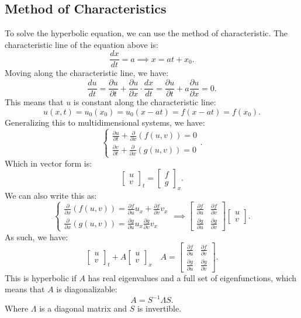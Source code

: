 \documentclass[../main/main.tex]{subfiles}
\begin{document}
\subsection{Method of Characteristics}
To solve the hyperbolic equation, we can use the method of characteristic. The characteristic line of the equation above is: \[
\frac{dx}{dt} = a \implies x = at + x_0
.\] Moving along the characteristic line, we have: \[
\frac{du}{dt}=  \frac{\partial u}{\partial t} + \frac{\partial u}{\partial x} \cdot  \frac{dx}{dt} =  \frac{\partial u}{\partial t} +a \frac{\partial u}{\partial x}  = 0
.\] This means that $u$ is constant along the characteristic line: \[
u(x,t) = u_0(x_0) = u_0(x-at) = f(x-at) = f(x_0)
.\] Generalizing this to multidimensional systems, we have: \[
\begin{cases}
    \frac{\partial u}{\partial t} + \frac{\partial }{\partial x} (f(u,v)) = 0 \\
    \frac{\partial v}{\partial t} + \frac{\partial }{\partial x} (g(u,v)) = 0
\end{cases}
.\] 
Which in vector form is: \[
    \begin{bmatrix} u\\v \end{bmatrix} _t = \begin{bmatrix} f \\ g \end{bmatrix} _x 
.\] 
We can also write this as: \[
\begin{cases}
   \frac{\partial }{\partial x} (f(u,v)) = \frac{\partial f}{\partial u}  u_x + \frac{\partial f}{\partial v} v_x\\
 \frac{\partial }{\partial x} (g(u,v)) = \frac{\partial g}{\partial u} u_x \frac{\partial g}{\partial v} v_x
\end{cases}
\implies \begin{bmatrix} \frac{\partial f}{\partial u} &\frac{\partial f}{\partial v} \\ \frac{\partial g}{\partial u} &\frac{\partial g}{\partial v}  \end{bmatrix} \begin{bmatrix} u\\v \end{bmatrix} 
.\] 
As such, we have: \[
    \begin{bmatrix} u\\v \end{bmatrix} _t + A \begin{bmatrix} u \\ v \end{bmatrix} _x \quad A = \begin{bmatrix} \frac{\partial f}{\partial u} &\frac{\partial f}{\partial v} \\ \frac{\partial g}{\partial u} &\frac{\partial g}{\partial v}  \end{bmatrix}
.\] 
This is hyperbolic if $A$  has real eigenvalues and a full set of eigenfunctions, which means that $A$ is diagonalizable: \[
A = S^{-1} \Lambda S
.\] Where $\Lambda$ is a diagonal matrix and  $S$ is invertible. 
\end{document}
